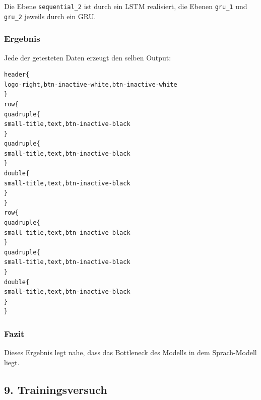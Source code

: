\documentclass[pdftex,a4paper,halfparskip, article]{scrartcl}
\begin{document}
Die Ebene \texttt{sequential\_2} ist durch ein LSTM realisiert, die Ebenen \texttt{gru\_1} und \texttt{gru\_2} jeweils durch ein GRU. 

\subsubsection*{Ergebnis}

Jede der getesteten Daten erzeugt den selben Output:
\begin{verbatim}
header{
logo-right,btn-inactive-white,btn-inactive-white
}
row{
quadruple{
small-title,text,btn-inactive-black
}
quadruple{
small-title,text,btn-inactive-black
}
double{
small-title,text,btn-inactive-black
}
}
row{
quadruple{
small-title,text,btn-inactive-black
}
quadruple{
small-title,text,btn-inactive-black
}
double{
small-title,text,btn-inactive-black
}
}
\end{verbatim}

\subsubsection*{Fazit}

Dieses Ergebnis legt nahe, dass das Bottleneck des Modells in dem Sprach-Modell liegt. 

\subsection{9. Trainingsversuch}

\end{document}
